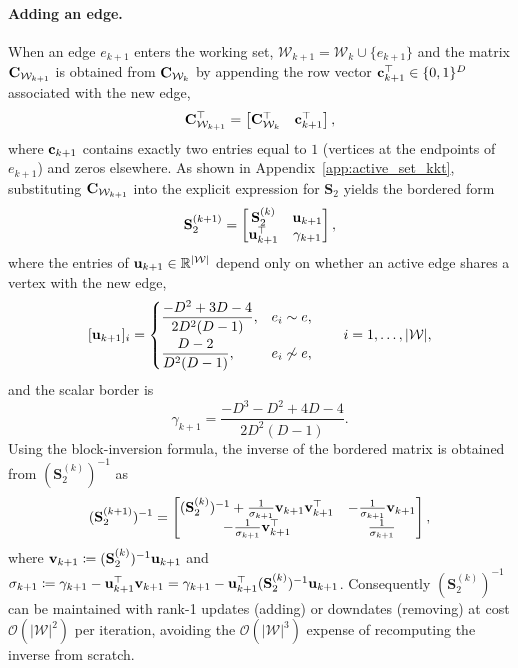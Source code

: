 \paragraph{Adding an edge.} When an edge $e_{k+1}$ enters the working set, $\mathcal{W}_{k+1}=\mathcal{W}_k\cup\{e_{k+1}\}$ and the matrix $\mathbf{C}_{\mathcal{W}_{k+1}}$ is obtained from $\mathbf{C}_{\mathcal{W}_k}$ by appending the row vector $\mathbf{c}_{k+1}^\top\in\{0,1\}^D$ associated with the new edge,
\begin{equation}
\mathbf{C}_{\mathcal{W}_{k+1}}^\top = \begin{bmatrix} \mathbf{C}_{\mathcal{W}_k}^\top & \mathbf{c}_{k+1}^\top \end{bmatrix},
\end{equation}
where $\mathbf{c}_{k+1}$ contains exactly two entries equal to $1$ (vertices at the endpoints of $e_{k+1}$) and zeros elsewhere. As shown in Appendix~\ref{app:active_set_kkt}, substituting $\mathbf{C}_{\mathcal{W}_{k+1}}$ into the explicit expression for $\mathbf{S}_2$ yields the bordered form
\begin{equation}
	\mathbf{S}_2^{(k+1)}
	=
	\begin{bmatrix}
		\mathbf{S}_2^{(k)} & \mathbf{u}_{k+1}\\
		\mathbf{u}_{k+1}^\top & \gamma_{k+1}
	\end{bmatrix},
\end{equation}
where the entries of $\mathbf{u}_{k+1}\in\mathbb{R}^{|\mathcal{W}|}$ depend only on whether an active edge shares a vertex with the new edge,
\begin{equation}\label{eq:u_entrywise_main}
	[\mathbf{u}_{k+1}]_i=
	\begin{cases}
		\displaystyle\frac{-D^2+3D-4}{2D^2(D-1)}, & e_i\sim e,\\[8pt]
		\displaystyle\frac{D-2}{D^2(D-1)}, & e_i\not\sim e,
	\end{cases}
	\qquad i=1,\dots,|\mathcal{W}|,
\end{equation}
and the scalar border is
\begin{equation}\label{eq:gamma_main}
	\gamma_{k+1}=\frac{-D^3-D^2+4D-4}{2D^2(D-1)}.
\end{equation}
Using the block-inversion formula, the inverse of the bordered matrix is obtained from $(\mathbf{S}_2^{(k)})^{-1}$ as
\begin{equation}\label{eq:S2_inv_update}
(\mathbf{S}_2^{(k+1)})^{-1} = \begin{bmatrix} (\mathbf{S}_2^{(k)})^{-1} + \frac{1}{\sigma_{k+1}}\mathbf{v}_{k+1}\mathbf{v}_{k+1}^\top & -\frac{1}{\sigma_{k+1}}\mathbf{v}_{k+1} \\[2pt] -\frac{1}{\sigma_{k+1}}\mathbf{v}_{k+1}^\top & \frac{1}{\sigma_{k+1}} \end{bmatrix},
\end{equation}
where $\mathbf{v}_{k+1}\coloneqq(\mathbf{S}_2^{(k)})^{-1}\mathbf{u}_{k+1}$ and $\sigma_{k+1}\coloneqq\gamma_{k+1}-\mathbf{u}_{k+1}^\top\mathbf{v}_{k+1}=\gamma_{k+1}-\mathbf{u}_{k+1}^\top(\mathbf{S}_2^{(k)})^{-1}\mathbf{u}_{k+1}$. Consequently $(\mathbf{S}_2^{(k)})^{-1}$ can be maintained with rank-1 updates (adding) or downdates (removing) at cost $\mathcal{O}(|\mathcal{W}|^2)$ per iteration, avoiding the $\mathcal{O}(|\mathcal{W}|^3)$ expense of recomputing the inverse from scratch. 

